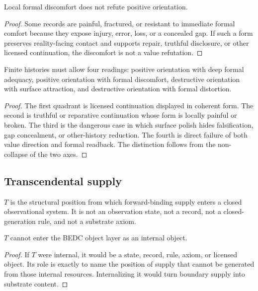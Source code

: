 \begin{theorem}
\label{thm:philosophy-formal-discomfort-not-value-refutation}
Local formal discomfort does not refute positive orientation.
\end{theorem}
\begin{proof}
Some records are painful, fractured, or resistant to immediate formal
comfort because they expose injury, error, loss, or a concealed gap.
If such a form preserves reality-facing contact and supports repair,
truthful disclosure, or other licensed continuation, the discomfort is
not a value refutation.
\end{proof}

\begin{corollary}
\label{cor:philosophy-four-quadrant-value-form-reading}
Finite histories must allow four readings: positive orientation with
deep formal adequacy, positive orientation with formal discomfort,
destructive orientation with surface attraction, and destructive
orientation with formal distortion.
\end{corollary}
\begin{proof}
The first quadrant is licensed continuation displayed in coherent
form. The second is truthful or reparative continuation whose form is
locally painful or broken. The third is the dangerous case in which
surface polish hides falsification, gap concealment, or
other-history reduction. The fourth is direct failure of both value
direction and formal readback. The distinction follows from the
non-collapse of the two axes.
\end{proof}

\subsection{Transcendental supply}
\label{subsec:philosophy-transcendental-supply}

\begin{definition}
\label{def:philosophy-transcendental-supply-position}
\(T\) is the structural position from which forward-binding supply
enters a closed observational system. It is not an observation state,
not a record, not a closed-generation rule, and not a substrate axiom.
\end{definition}

\begin{theorem}
\label{thm:philosophy-t-cannot-be-internalized}
\(T\) cannot enter the BEDC object layer as an internal object.
\end{theorem}
\begin{proof}
If \(T\) were internal, it would be a state, record, rule, axiom, or
licensed object. Its role is exactly to name the position of supply
that cannot be generated from those internal resources. Internalizing
it would turn boundary supply into substrate content.
\end{proof}


